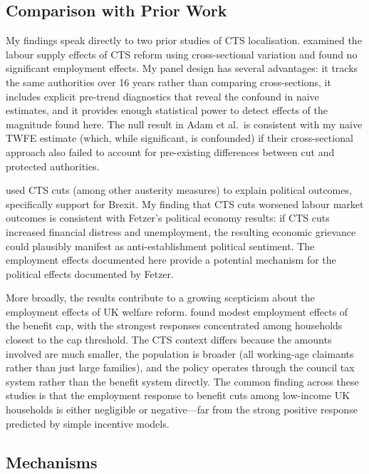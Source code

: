\documentclass[12pt]{article}
\begin{document}
\subsection{Comparison with Prior Work}

My findings speak directly to two prior studies of CTS localisation. \citet{adam2019taxing} examined the labour supply effects of CTS reform using cross-sectional variation and found no significant employment effects. My panel design has several advantages: it tracks the same authorities over 16 years rather than comparing cross-sections, it includes explicit pre-trend diagnostics that reveal the confound in naive estimates, and it provides enough statistical power to detect effects of the magnitude found here. The null result in Adam et al.\ is consistent with my naive TWFE estimate (which, while significant, is confounded) if their cross-sectional approach also failed to account for pre-existing differences between cut and protected authorities.

\citet{fetzer2019austerity} used CTS cuts (among other austerity measures) to explain political outcomes, specifically support for Brexit. My finding that CTS cuts worsened labour market outcomes is consistent with Fetzer's political economy results: if CTS cuts increased financial distress and unemployment, the resulting economic grievance could plausibly manifest as anti-establishment political sentiment. The employment effects documented here provide a potential mechanism for the political effects documented by Fetzer.

More broadly, the results contribute to a growing scepticism about the employment effects of UK welfare reform. \citet{brewer2019did} found modest employment effects of the benefit cap, with the strongest responses concentrated among households closest to the cap threshold. The CTS context differs because the amounts involved are much smaller, the population is broader (all working-age claimants rather than just large families), and the policy operates through the council tax system rather than the benefit system directly. The common finding across these studies is that the employment response to benefit cuts among low-income UK households is either negligible or negative---far from the strong positive response predicted by simple incentive models.

\subsection{Mechanisms}
\end{document}
